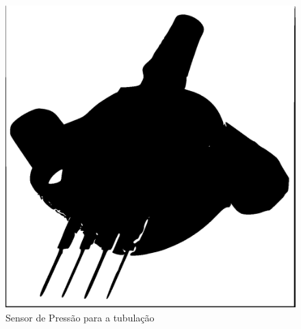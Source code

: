 \begin{figure}[!htb]                   
	\centering                          
	\includegraphics[scale=0.5]{figuras/Figura-5.eps}
	\caption{Sensor de Pressão para a tubulação}               
\end{figure}
